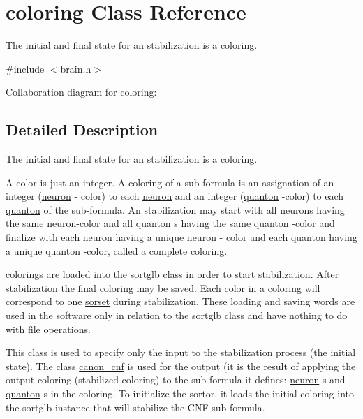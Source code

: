 \hypertarget{classcoloring}{}\section{coloring Class Reference}
\label{classcoloring}


The initial and final state for an stabilization is a coloring.  




{\ttfamily \#include $<$brain.\+h$>$}



Collaboration diagram for coloring\+:


\subsection{Detailed Description}
The initial and final state for an stabilization is a coloring. 

A color is just an integer. A coloring of a sub-\/formula is an assignation of an integer (\hyperlink{classneuron}{neuron} -\/ color) to each \hyperlink{classneuron}{neuron} and an integer (\hyperlink{classquanton}{quanton} -\/color) to each \hyperlink{classquanton}{quanton} of the sub-\/formula. An stabilization may start with all neurons having the same neuron-\/color and all \hyperlink{classquanton}{quanton} s having the same \hyperlink{classquanton}{quanton} -\/color and finalize with each \hyperlink{classneuron}{neuron} having a unique \hyperlink{classneuron}{neuron} -\/ color and each \hyperlink{classquanton}{quanton} having a unique \hyperlink{classquanton}{quanton} -\/color, called a complete coloring.

colorings are \textquotesingle{}\textquotesingle{}loaded\textquotesingle{}\textquotesingle{} into the sortglb class in order to start stabilization. After stabilization the final coloring may be \textquotesingle{}\textquotesingle{}saved\textquotesingle{}\textquotesingle{}. Each color in a coloring will correspond to one \hyperlink{classsorset}{sorset} during stabilization. These \textquotesingle{}\textquotesingle{}loading\textquotesingle{}\textquotesingle{} and \textquotesingle{}\textquotesingle{}saving\textquotesingle{}\textquotesingle{} words are used in the software only in relation to the sortglb class and have nothing to do with file operations.

This class is used to specify only the input to the stabilization process (the initial state). The class \hyperlink{classcanon__cnf}{canon\+\_\+cnf} is used for the output (it is the result of applying the output coloring (stabilized coloring) to the sub-\/formula it defines\+: \hyperlink{classneuron}{neuron} s and \hyperlink{classquanton}{quanton} s in the coloring. To initialize the sortor, it \textquotesingle{}\textquotesingle{}loads\textquotesingle{}\textquotesingle{} the initial coloring into the sortglb instance that will stabilize the C\+NF sub-\/formula. 


